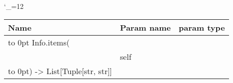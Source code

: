 \begingroup \catcode`\_=12 \tt
\begin{tabular}{lll}
\toprule
\textrm{Name}&\textrm{Param name}&\textrm{param type}\\
\midrule
\hbox to 0pt {Info.items(\hss}\\
& self\\
\hbox to 0pt{) -> List[Tuple[str, str]]\hss}\\
\bottomrule
\end{tabular}
\endgroup
